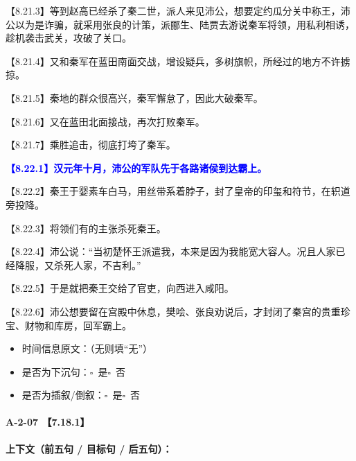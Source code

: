 \documentclass[fontset=none,11pt,a4paper]{ctexart}
\newcommand{\answerline}[1]{\underline{\hspace{#1}}}
\newcommand{\choicebox}[1]{$\square$~#1}
\begin{document}
\noindent 【8.21.3】等到赵高已经杀了秦二世，派人来见沛公，想要定约瓜分关中称王，沛公以为是诈骗，就采用张良的计策，派郦生、陆贾去游说秦军将领，用私利相诱，趁机袭击武关，攻破了关口。\par
\noindent 【8.21.4】又和秦军在蓝田南面交战，增设疑兵，多树旗帜，所经过的地方不许掳掠。\par
\noindent 【8.21.5】秦地的群众很高兴，秦军懈怠了，因此大破秦军。\par
\noindent 【8.21.6】又在蓝田北面接战，再次打败秦军。\par
\noindent 【8.21.7】乘胜追击，彻底打垮了秦军。\par
\noindent \textcolor{blue}{\textbf{【8.22.1】汉元年十月，沛公的军队先于各路诸侯到达霸上。}}\par
\noindent 【8.22.2】秦王于婴素车白马，用丝带系着脖子，封了皇帝的印玺和符节，在轵道旁投降。\par
\noindent 【8.22.3】将领们有的主张杀死秦王。\par
\noindent 【8.22.4】沛公说：“当初楚怀王派遣我，本来是因为我能宽大容人。况且人家已经降服，又杀死人家，不吉利。”\par
\noindent 【8.22.5】于是就把秦王交给了官吏，向西进入咸阳。\par
\noindent 【8.22.6】沛公想要留在宫殿中休息，樊哙、张良劝说后，才封闭了秦宫的贵重珍宝、财物和库房，回军霸上。\par

\begin{itemize}
  \item 时间信息原文：\answerline{7.5cm}（无则填“无”）
  \item 是否为下沉句：\choicebox{是}\quad \choicebox{否}
  \item 是否为插叙/倒叙：\choicebox{是}\quad \choicebox{否}
\end{itemize}

\paragraph{A-2-07 \quad 【7.18.1】}
\textbf{上下文（前五句 / 目标句 / 后五句）：}
\end{document}

